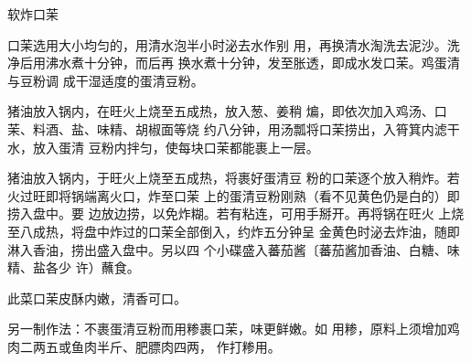 \begin{recipe}{软炸口茉}

\ingredients



\cooking

\step 口茉选用大小均匀的，用清水泡半小时泌去水作别 用，再换清水淘洗去泥沙。洗净后用沸水煮十分钟，而后再 换水煮十分钟，发至胀透，即成水发口茉。鸡蛋清与豆粉调 成干湿适度的蛋清豆粉。

\step 猪油放入锅内，在旺火上烧至五成热，放入葱、姜稍 煸，即依次加入鸡汤、口茉、料酒、盐、味精、胡椒面等烧 约八分钟，用汤瓢将口茉捞出，入筲箕内滤干水，放入蛋清 豆粉内拌匀，使每块口茉都能裹上一层。

\step 猪油放入锅内，于旺火上烧至五成热，将裹好蛋清豆 粉的口茉逐个放入稍炸。若火过旺即将锅端离火口，炸至口茉 上的蛋清豆粉刚熟（看不见黄色仍是白的）即捞入盘中。要 边放边捞，以免炸糊。若有粘连，可用手掰开。再将锅在旺火 上烧至八成热，将盘中炸过的口茉全部倒入，约炸五分钟呈 金黄色时泌去炸油，随即淋入香油，捞出盛入盘中。另以四 个小碟盛入蕃茄酱〔蕃茄酱加香油、白糖、味精、盐各少 许）蘸食。

\notes

此菜口茉皮酥内嫩，清香可口。

另一制作法：不裹蛋清豆粉而用糁裹口茉，味更鲜嫩。如 用糁，原料上须增加鸡肉二两五或鱼肉半斤、肥膘肉四两， 作打糁用。

\end{recipe}

